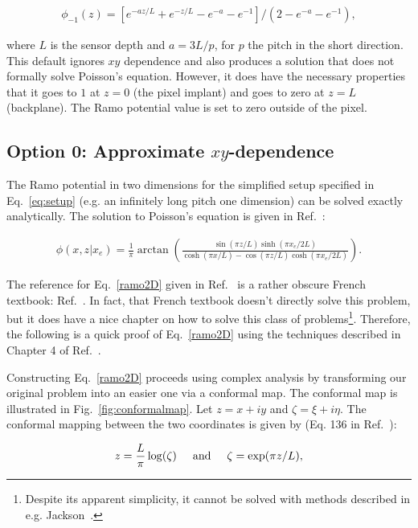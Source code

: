 \documentclass[12pt]{article}
\begin{document}
\begin{align}
\phi_{-1}(z)=[e^{-az/L}+e^{-z/L}-e^{-a}-e^{-1}]/(2-e^{-a}-e^{-1}),
\end{align}

\noindent where $L$ is the sensor depth and $a=3L/p$, for $p$ the pitch in the short direction.  This default ignores $xy$ dependence and also produces a solution that does not formally solve Poisson's equation.  However, it does have the necessary properties that it goes to $1$ at $z=0$ (the pixel implant) and goes to zero at $z=L$ (backplane).   The Ramo potential value is set to zero outside of the pixel.

\subsection{Option 0: Approximate $xy$-dependence}

The Ramo potential in two dimensions for the simplified setup specified in Eq.~\ref{eq:setup} (e.g. an infinitely long pitch one dimension) can be solved exactly analytically.  The solution to Poisson's equation is given in Ref.~\cite{PixelDetectors}:

\begin{align}
\label{ramo2D}
\phi(x,z|x_e)=\frac{1}{\pi}\arctan\left(\frac{\sin(\pi z/L)\sinh(\pi x_e/2L)}{\cosh(\pi x/L)-\cos(\pi z/L)\cosh(\pi x_e/2L)}\right).
\end{align}

\noindent The reference for Eq.~\ref{ramo2D} given in Ref.~\cite{PixelDetectors} is a rather obscure French textbook: Ref.~\cite{Electrostatique}.  In fact, that French textbook doesn't directly solve this problem, but it does have a nice chapter on how to solve this class of problems\footnote{Despite its apparent simplicity, it cannot be solved with methods described in e.g. Jackson~\cite{jackson}.}.  Therefore, the following is a quick proof of Eq.~\ref{ramo2D} using the techniques described in Chapter 4 of Ref.~\cite{Electrostatique}. 

Constructing Eq.~\ref{ramo2D} proceeds using complex analysis by transforming our original problem into an easier one via a conformal map.  The conformal map is illustrated in Fig.~\ref{fig:conformalmap}.  Let $z=x+iy$ and $\zeta=\xi+i\eta$.  The conformal mapping between the two coordinates is given by (Eq. 136 in Ref.~\cite{Electrostatique}):

\begin{align}
\label{eq:conformalmap}
z=\frac{L}{\pi}\log(\zeta)\hspace{5mm}\text{and}\hspace{5mm}\zeta = \exp(\pi z/L),
\end{align}
\end{document}
